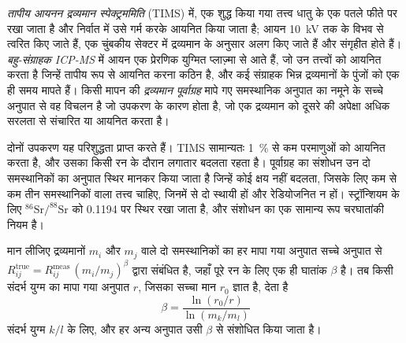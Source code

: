 \begin{definition}\label{def:b2:field-lab-methods-2:tims}
\emph{तापीय आयनन द्रव्यमान स्पेक्ट्रममिति} (TIMS) में, एक
शुद्ध किया गया तत्त्व धातु के एक पतले फीते पर रखा जाता है और निर्वात में उसे गर्म करके आयनित किया जाता है; आयन
\qty{10}{kV} तक के विभव से त्वरित किए जाते हैं, एक चुंबकीय सेक्टर में द्रव्यमान के अनुसार अलग किए जाते हैं
और संगृहीत होते हैं। \emph{बहु-संग्राहक ICP-MS} में आयन एक
प्रेरणिक युग्मित प्लाज़्मा से आते हैं, जो उन तत्त्वों को आयनित करता है जिन्हें तापीय रूप से आयनित करना कठिन है, और कई
संग्राहक भिन्न द्रव्यमानों के पुंजों को एक ही समय मापते हैं। किसी मापन की \emph{द्रव्यमान
पूर्वाग्रह} मापे गए समस्थानिक अनुपात का नमूने के सच्चे अनुपात से वह विचलन है
जो उपकरण के कारण होता है, जो एक द्रव्यमान को दूसरे की अपेक्षा अधिक सरलता से
संचारित या आयनित करता है।
\end{definition}

दोनों उपकरण यह परिशुद्धता प्राप्त करते हैं। TIMS सामान्यतः
\qty{1}{\percent} से कम परमाणुओं को आयनित करता है, और उसका  किसी रन के दौरान लगातार बदलता रहता है। पूर्वाग्रह का संशोधन उन दो समस्थानिकों का अनुपात स्थिर मानकर किया जाता है जिन्हें कोई
क्षय नहीं बदलता, जिसके लिए कम से कम तीन समस्थानिकों वाला तत्त्व चाहिए, जिनमें से दो स्थायी हों और
रेडियोजनित न हों। स्ट्रॉन्शियम के लिए $^{86}\mathrm{Sr}/^{88}\mathrm{Sr}$ को 0.1194 पर स्थिर रखा जाता है, और संशोधन का
एक सामान्य रूप चरघातांकी नियम है।

\begin{proposition}[द्रव्यमान पूर्वाग्रह का चरघातांकी नियम]\label{prop:b2:field-lab-methods-2:bias}
मान लीजिए द्रव्यमानों $m_i$ और $m_j$ वाले दो समस्थानिकों का हर मापा गया अनुपात सच्चे
अनुपात से $R_{ij}^{\mathrm{true}} = R_{ij}^{\mathrm{meas}}\,(m_i/m_j)^{\beta}$ द्वारा संबंधित है, जहाँ पूरे रन के लिए एक ही घातांक
$\beta$ है। तब किसी संदर्भ युग्म का मापा गया अनुपात $r$, जिसका सच्चा मान
$r_0$ ज्ञात है, देता है
\begin{equation}
\beta = \frac{\ln(r_0/r)}{\ln(m_k/m_l)}
\label{eq:b2:field-lab-methods-2:beta}
\end{equation}
संदर्भ युग्म $k/l$ के लिए, और हर अन्य अनुपात उसी $\beta$ से संशोधित किया जाता है।
\end{proposition}

